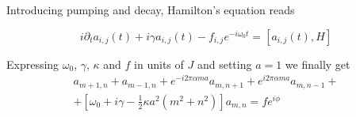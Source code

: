 \documentclass[a4paper,prb,10pt,aps,twocolumn]{revtex4-1}
\begin{document}



Introducing pumping and decay, Hamilton's equation reads

\begin{equation}
  \label{eq:6}
i\partial_{t}a_{i,j}(t)+i\gamma a_{i,j}(t)-f_{i,j}e^{-i\omega_{0}t}=\left[a_{i,j}(t),H\right]  
\end{equation}






Expressing $\omega_{0}$, $\gamma$, $\kappa$ and $f$ in units of $J$ and setting $a=1$ we finally get
\begin{multline}
  \label{eq:12}
a_{m+1,n}+a_{m-1,n}+e^{-i2\pi\alpha ma}a_{m,n+1}+e^{i2\pi\alpha ma}a_{m,n-1}+\\+\left[\omega_{0}+i\gamma-\frac{1}{2}\kappa a^{2}(m^{2}+n^{2})\right]a_{m,n}=fe^{i\phi}  
\end{multline}
\end{document}
